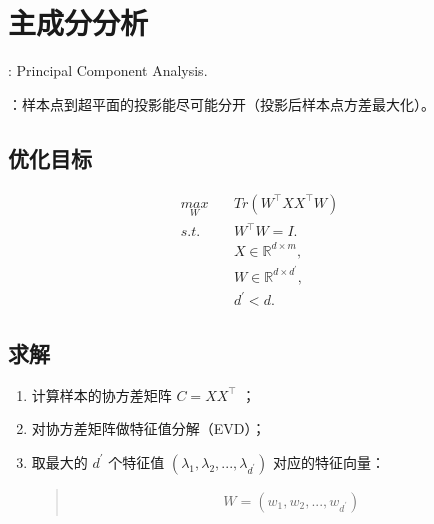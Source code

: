 \documentclass[letterpaper,10pt,english]{sphinxmanual}
\begin{document}
\section{主成分分析}
\label{\detokenize{machineLearning/03_pca::doc}}\label{\detokenize{machineLearning/03_pca:id1}}
 : Principal Component Analysis.

 ：样本点到超平面的投影能尽可能分开（投影后样本点方差最大化）。


\subsection{优化目标}
\label{\detokenize{machineLearning/03_pca:id2}}\begin{equation*}
\begin{split}\underset{W}{max} & & \ Tr(W^{\top}XX^{\top}W) \\
s.t. & & \ W^{\top}W=I. \\
& &\ X \in \mathbb{R}^{d \times m}, \\
& &\ W \in \mathbb{R}^{d \times d^\prime}, \\
& &\ d^\prime < d.\end{split}
\end{equation*}

\subsection{求解}
\label{\detokenize{machineLearning/03_pca:id3}}\begin{enumerate}
\item {} 
计算样本的协方差矩阵 \(C = XX^{\top}\) ；

\item {} 
对协方差矩阵做特征值分解（EVD）；

\item {} 
取最大的 \(d^\prime\) 个特征值 \((\lambda_1, \lambda_2,...,\lambda_{d^\prime})\) 对应的特征向量：
\begin{quote}
\begin{equation*}
\begin{split}W = (w_1, w_2,...,w_{d^\prime})\end{split}
\end{equation*}\end{quote}

\end{enumerate}
\end{document}
